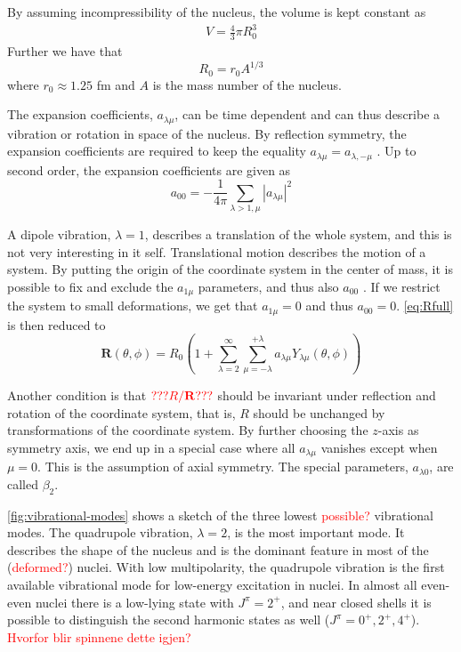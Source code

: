 \documentclass[twoside,english]{uiofysmaster/uiofysmaster}
\let\orgautoref\autoref
\renewcommand{\autoref}
        {%
		 \def\sectionautorefname{Section}%
		 \def\subsectionautorefname{Section}%
		 \def\subsubsectionautorefname{Section}%
		 \def\chapterautorefname{Chapter}%
          \orgautoref}
\begin{document}
By assuming incompressibility of the nucleus, the volume is kept constant as
\begin{align*}
	V = \frac{4}{3} \pi R_0^3
\end{align*}
Further we have that
\begin{equation}\label{eq:radius}
	R_0 = r_0 A^{1/3}
\end{equation}
where $r_0 \approx 1.25$ fm and $A$ is the mass number of the nucleus.

The expansion coefficients, $a_{\lambda \mu}$, can be time dependent and can thus describe a vibration or rotation in space of the nucleus. 
By reflection symmetry, the expansion coefficients are required to keep the equality $a_{\lambda \mu} = a_{\lambda, -\mu}$ \cite{Krane}.
Up to second order, the expansion coefficients are given as
\begin{equation}
	a_{00} = -\frac{1}{4\pi} \sum_{\lambda > 1, \mu} | a_{\lambda\mu} |^2
\end{equation}

A dipole vibration, $\lambda = 1$, describes a translation of the whole system, and this is not very interesting in it self. 
Translational motion describes the motion of a system. 
By putting the origin of the coordinate system in the center of mass, it is possible to fix and exclude the $a_{1\mu}$ parameters, and thus also $a_{00}$ \cite{RS}. 
If we restrict the system to small deformations, we get that $a_{1\mu} = 0$ and thus $a_{00} = 0$.
\autoref{eq:Rfull} is then reduced to
\begin{equation}\label{eq:Rmid}
	\mathbf{R}(\theta, \phi) = R_0 \left( 1 +  \sum^\infty_{\lambda = 2} \sum^{+\lambda}_{\mu = -\lambda} a_{\lambda \mu} Y_{\lambda \mu}(\theta, \phi) \right)
\end{equation}

Another condition is that $\textcolor{red}{??? R / \mathbf{R} ???}$ should be invariant under reflection and rotation of the coordinate system, that is, $R$ should be unchanged by transformations of the coordinate system.
By further choosing the $z$-axis as symmetry axis, we end up in a special case where all $a_{\lambda \mu}$ vanishes except when $\mu = 0$. 
This is the assumption of axial symmetry.
The special parameters, $a_{\lambda 0}$, are called $\beta_2$.

\autoref{fig:vibrational-modes} shows a sketch of the three lowest \textcolor{red}{possible?} vibrational modes. 
The quadrupole vibration, $\lambda = 2$, is the most important mode.
It describes the shape of the nucleus and is the dominant feature in most of the (\textcolor{red}{deformed?}) nuclei. 
With low multipolarity, the quadrupole vibration is the first available vibrational mode for low-energy excitation in nuclei.
In almost all even-even nuclei there is a low-lying state with $J^\pi = 2^+$, and near closed shells it is possible to distinguish the second harmonic states as well ($J^\pi = 0^+, 2^+, 4^+$). 
\textcolor{red}{Hvorfor blir spinnene dette igjen?}
\end{document}
